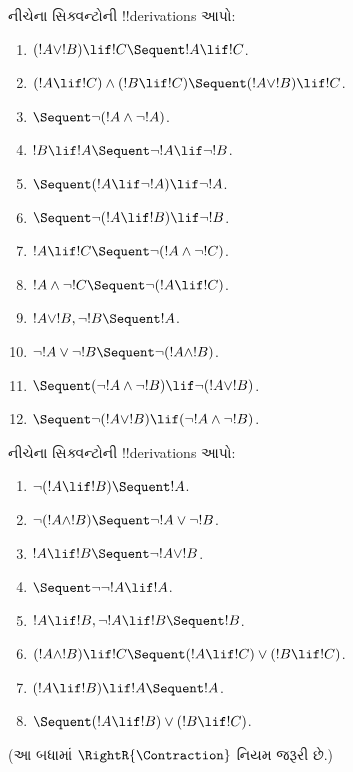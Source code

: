 \documentclass[../../../include/open-logic-section]{subfiles}
\begin{document}
\begin{prob}
નીચેના સિક્વન્ટોની !!{derivation}s આપો:
\begin{enumerate}
\item $(!A \lor !B) \lif !C \Sequent !A \lif !C$.
\item $(!A \lif !C) \land (!B \lif !C) \Sequent (!A \lor !B) \lif !C$.
\item $\Sequent \lnot(!A \land \lnot !A)$.
\item $!B \lif !A \Sequent \lnot !A \lif \lnot !B$.
\item $\Sequent (!A \lif \lnot !A) \lif \lnot !A$.
\item $\Sequent \lnot(!A \lif !B) \lif \lnot !B$.
\item $!A \lif !C \Sequent \lnot (!A \land \lnot !C)$.
\item $!A \land \lnot !C \Sequent \lnot (!A \lif !C)$.
\item $!A \lor !B, \lnot !B \Sequent !A$.
\item $\lnot !A \lor \lnot !B \Sequent \lnot(!A \land !B)$.
\item $\Sequent (\lnot !A \land \lnot !B) \lif\lnot(!A \lor !B)$.
\item $\Sequent \lnot(!A \lor !B) \lif (\lnot !A \land \lnot !B)$.
\end{enumerate}
\end{prob}

\begin{prob}
નીચેના સિક્વન્ટોની !!{derivation}s આપો:
\begin{enumerate}
\item $\lnot(!A \lif !B) \Sequent !A$.
\item $\lnot(!A \land !B) \Sequent \lnot !A \lor \lnot !B$.
\item $!A \lif !B \Sequent \lnot !A \lor !B$.
\item $\Sequent \lnot \lnot !A \lif !A$.
\item $!A \lif !B, \lnot !A \lif !B \Sequent !B$.
\item $(!A \land !B) \lif !C \Sequent (!A \lif !C) \lor (!B \lif !C)$.
\item $(!A \lif !B) \lif !A \Sequent !A$.
\item $\Sequent (!A \lif !B) \lor (!B \lif !C)$.
\end{enumerate}
(આ બધામાં $\RightR{\Contraction}$ નિયમ જરૂરી છે.)
\end{prob}
\end{document}
